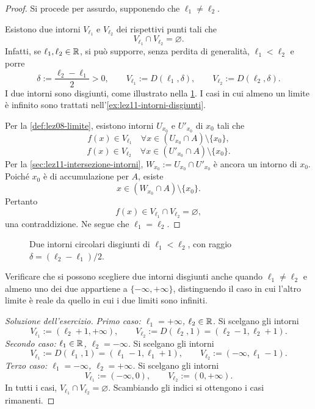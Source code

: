 \begin{proof}
Si procede per assurdo, supponendo che
\(\ell_1\ne\ell_2\).

Esistono due intorni \(V_{\ell_1}\) e \(V_{\ell_2}\) dei
rispettivi punti tali che
\[
  V_{\ell_1}\cap V_{\ell_2}=\varnothing.
\]
Infatti, se \(\ell_1,\ell_2\in\mathbb{R}\), si può supporre,
senza perdita di generalità, \(\ell_1<\ell_2\) e porre
\[
  \delta:=\frac{\ell_2-\ell_1}{2}>0,
  \qquad
  V_{\ell_1}:=D(\ell_1,\delta),
  \qquad
  V_{\ell_2}:=D(\ell_2,\delta).
\]
I due intorni sono disgiunti, come illustrato nella
\cref{fig:lez11-intorni-disgiunti}. I casi in cui almeno
un limite è infinito sono trattati
nell'\cref{ex:lez11-intorni-disgiunti}.

Per la \cref{def:lez08-limite}, esistono intorni
\(U_{x_0}\) e \(U'_{x_0}\) di \(x_0\) tali che
\[
  f(x)\in V_{\ell_1}
  \quad\forall x\in(U_{x_0}\cap A)\setminus\{x_0\},
\]
\[
  f(x)\in V_{\ell_2}
  \quad\forall x\in(U'_{x_0}\cap A)\setminus\{x_0\}.
\]
Per la \cref{sec:lez11-intersezione-intorni},
\(W_{x_0}:=U_{x_0}\cap U'_{x_0}\) è ancora un intorno
di \(x_0\). Poiché \(x_0\) è di accumulazione per
\(A\), esiste
\[
  x\in(W_{x_0}\cap A)\setminus\{x_0\}.
\]
Pertanto
\[
  f(x)\in V_{\ell_1}\cap V_{\ell_2}=\varnothing,
\]
una contraddizione. Ne segue che \(\ell_1=\ell_2\).
\end{proof}

\begin{figure}[htbp]
  \centering
  
  \caption{Due intorni circolari disgiunti di
  \(\ell_1<\ell_2\), con raggio
  \(\delta=(\ell_2-\ell_1)/2\).}
  \label{fig:lez11-intorni-disgiunti}
\end{figure}

\begin{exercise}
\label{ex:lez11-intorni-disgiunti}
Verificare che si possono scegliere due intorni disgiunti
anche quando \(\ell_1\ne\ell_2\) e almeno uno dei due
appartiene a \(\{-\infty,+\infty\}\), distinguendo
il caso in cui l'altro limite è reale da quello
in cui i due limiti sono infiniti.
\end{exercise}

\begin{proof}[Soluzione dell'esercizio]
\emph{Primo caso: \(\ell_1=+\infty\), \(\ell_2\in\mathbb{R}\).}
Si scelgano gli intorni
\[
  V_{\ell_1}:=(\ell_2+1,+\infty),
  \qquad
  V_{\ell_2}:=D(\ell_2,1)=(\ell_2-1,\ell_2+1).
\]
\emph{Secondo caso: \(\ell_1\in\mathbb{R}\), \(\ell_2=-\infty\).}
Si scelgano gli intorni
\[
  V_{\ell_1}:=D(\ell_1,1)=(\ell_1-1,\ell_1+1),
  \qquad
  V_{\ell_2}:=(-\infty,\ell_1-1).
\]
\emph{Terzo caso: \(\ell_1=-\infty\), \(\ell_2=+\infty\).}
Si scelgano gli intorni
\[
  V_{\ell_1}:=(-\infty,0),
  \qquad
  V_{\ell_2}:=(0,+\infty).
\]
In tutti i casi, \(V_{\ell_1}\cap V_{\ell_2}=\varnothing\).
Scambiando gli indici si ottengono i casi rimanenti.
\end{proof}

